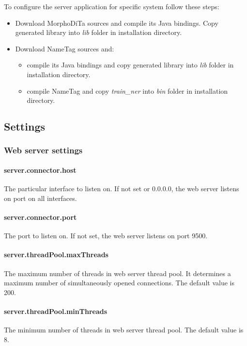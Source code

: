 \documentclass[12pt,a4paper]{report}
\begin{document}
To configure the server application for specific system follow these steps:
\begin{itemize}
\item Download MorphoDiTa sources and compile its Java bindings. Copy generated
library into \emph{lib} folder in installation directory.
\item Download NameTag sources and:
	\begin{itemize}
	\item compile its Java bindings and copy generated library into \emph{lib}
	folder in installation directory.
	\item compile NameTag and copy \emph{train\_ner} into \emph{bin} folder in
	installation directory.
	\end{itemize}
\end{itemize}

\subsection{Settings}
\label{sec:ServerSettings}

\subsubsection{Web server settings}
\label{sssec:WebServerSettings}

\paragraph{server.connector.host}
The particular interface to listen on. If not set or 0.0.0.0, the web server
listens on port on all interfaces.

\paragraph{server.connector.port}
The port to listen on. If not set, the web server listens on port 9500.

\paragraph{server.threadPool.maxThreads}
The maximum number of threads in web server thread pool. It determines a maximum
number of simultaneously opened connections. The default value is 200.

\paragraph{server.threadPool.minThreads}
The minimum number of threads in web server thread pool. The default value is 8.
\end{document}
